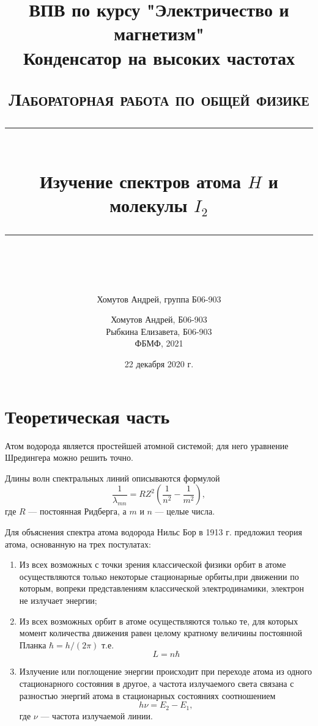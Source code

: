 \documentclass[a4paper, 12pt]{article}
\author{Хомутов Андрей, группа Б06-903}
\title{ВПВ по курсу "Электричество и магнетизм" \\ Конденсатор на высоких частотах}
\date{22 декабря 2020 г.}
\newcommand{\HRule}[1]{\rule{\linewidth}{#1}}
\begin{document}
\title{ \normalsize \textsc{Лабораторная работа по общей физике}
		\\ [4.0cm]
		\HRule{0.5pt} \\ [0.3cm]
		\LARGE \textbf{{Изучение спектров атома $H$ и молекулы $I_2$}}
		\HRule{0.5pt} \\ [0.1cm]
		\normalsize  \vspace*{18\baselineskip}}

\date{}

\author{
		Хомутов Андрей, Б06-903 \\
		Рыбкина Елизавета, Б06-903\\
ФБМФ, 2021\\ }

\maketitle
\thispagestyle{empty}
\newpage

 
\section{Теоретическая часть}
Атом водорода является простейшей атомной системой; для него уравнение Шредингера можно решить точно. 

Длины волн спектральных линий описываются формулой 
\begin{equation}
\dfrac{1}{\lambda_{mn}} = RZ^2\left(\frac{1}{n^2} - \frac{1}{m^2}\right),
\end{equation}
где $R$ --- постоянная Ридберга, а $m$ и $n$ --- целые числа.

Для объяснения спектра атома водорода Нильс Бор в 1913 г. предложил теория атома, основанную на трех постулатах:

\begin{enumerate}
\item Из всех возможных с точки зрения классической физики орбит в атоме осуществляются только некоторые стационарные орбиты,при движении по которым, вопреки представлениям классической электродинамики, электрон не излучает энергии;
\item Из всех возможных орбит в атоме осуществляются только те, для которых момент количества движения равен целому кратному величины постоянной Планка $\hbar = h/(2\pi)$ т.е.
\begin{equation}
L = n \hbar
\end{equation}
\item Излучение или поглощение энергии происходит при переходе атома из одного стационарного состояния в другое, а частота излучаемого света связана с разностью энергий атома в стационарных состояниях соотношением 
\begin{equation}
h \nu = E_2 - E_1,
\end{equation}
где $\nu$ --- частота излучаемой линии.
\end{enumerate}
\end{document}
